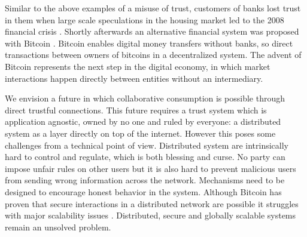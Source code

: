Similar to the above examples of a misuse of trust, customers of banks lost trust in them when large
scale speculations in the housing market led to the 2008 financial crisis \cite{financial_crisis}. 
Shortly afterwards an alternative financial system was proposed with Bitcoin \cite{nakamoto2008bitcoin}.
Bitcoin enables digital money transfers without banks, so direct transactions between owners of 
bitcoins in a decentralized system. The advent of Bitcoin represents the next step in the digital
economy, in which market interactions happen directly between entities without an intermediary.



We envision a future in which collaborative consumption is possible through direct trustful connections. This
future requires a trust system which is application agnostic, owned by no one and ruled by 
everyone: a distributed system as a layer directly on top of the internet. However this poses some 
challenges from a technical point of view. Distributed system are intrinsically hard to control and regulate, which is both 
blessing and curse. No party can impose unfair rules on other users but it is also hard to prevent 
malicious users from sending wrong information across the network. Mechanisms need to be designed to
encourage honest behavior in the system. Although Bitcoin has proven that secure interactions in a
distributed network are possible it struggles with major scalability issues \cite{gervais2016security}.
Distributed, secure and globally scalable systems remain an unsolved problem. 

